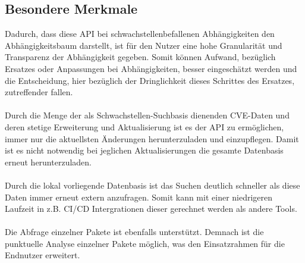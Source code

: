 \subsection{Besondere Merkmale} \label{sec:Besondere Merkmale}
    Dadurch, dass diese \ac{API} bei schwachstellenbefallenen Abhängigkeiten den Abhängigkeitsbaum darstellt, ist für den Nutzer eine hohe Granularität und Transparenz der Abhängigkeit gegeben.
    Somit können Aufwand, bezüglich Ersatzes oder Anpassungen bei Abhängigkeiten, besser eingeschätzt werden und die Entscheidung, hier bezüglich der Dringlichkeit dieses Schrittes des Ersatzes, zutreffender fallen.
    \\ \\
    Durch die Menge der als Schwachstellen-Suchbasis dienenden \ac{CVE}-Daten und deren stetige Erweiterung und Aktualisierung ist es der \ac{API} zu ermöglichen, immer nur die aktuellsten Änderungen herunterzuladen und einzupflegen.
    Damit ist es nicht notwendig bei jeglichen Aktualisierungen die gesamte Datenbasis erneut herunterzuladen.
    \\ \\
    Durch die lokal vorliegende Datenbasis ist das Suchen deutlich schneller als diese Daten immer erneut extern anzufragen.
    Somit kann mit einer niedrigeren Laufzeit in z.B. CI/CD Intergrationen dieser gerechnet werden als andere Tools.
    \\ \\
    Die Abfrage einzelner Pakete ist ebenfalls unterstützt.
    Demnach ist die punktuelle Analyse einzelner Pakete möglich, was den Einsatzrahmen für die Endnutzer erweitert.
